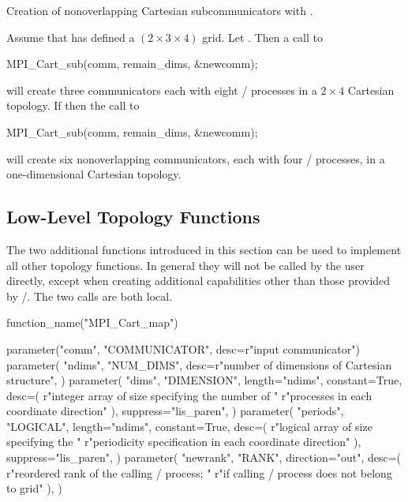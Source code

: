 \begin{example}
\label{topol-exE}
%
Creation of nonoverlapping Cartesian subcommunicators with .

Assume that  has defined a
$(2 \times 3 \times 4)$ grid. Let .
Then a call to
\begin{mpicodeblock}
MPI\_Cart\_sub(comm, remain\_dims, \&newcomm);
\end{mpicodeblock}
\noindent will create three communicators each with eight \MPI/ processes
in a $2 \times 4$ Cartesian
topology.  If  then the call to
\begin{mpicodeblock}
MPI\_Cart\_sub(comm, remain\_dims, \&newcomm);
\end{mpicodeblock}
\noindent will create six nonoverlapping
communicators, each with four \MPI/ processes,
in a one-dimensional Cartesian topology.

\end{example}

\subsection{Low-Level Topology Functions}
\label{subsec:topol-lowlevel}
%
The two additional functions introduced in this section can be used to
implement all other topology functions. In general they will not be
called by the user directly, except when creating additional
 capabilities other than those provided by \MPI/.
The two calls are both local.

\begin{mpi-binding}
    function_name("MPI_Cart_map")
    
    parameter("comm", "COMMUNICATOR", desc=r"input communicator")
    parameter(
        "ndims", "NUM_DIMS", desc=r"number of dimensions of Cartesian structure",
    )
    parameter(
        "dims",
        "DIMENSION",
        length="ndims",
        constant=True,
        desc=(
            r"integer array of size  specifying the number of "
            r"processes in each coordinate direction"
        ),
        suppress="lis_paren",
    )
    parameter(
        "periods",
        "LOGICAL",
        length="ndims",
        constant=True,
        desc=(
            r"logical array of size  specifying the "
            r"periodicity specification in each coordinate direction"
        ),
        suppress="lis_paren",
    )
    parameter(
        "newrank",
        "RANK",
        direction="out",
        desc=(
            r"reordered rank of the calling \MPI/ process;  "
            r"if calling \MPI/ process does not belong to grid"
        ),
    )
\end{mpi-binding}

